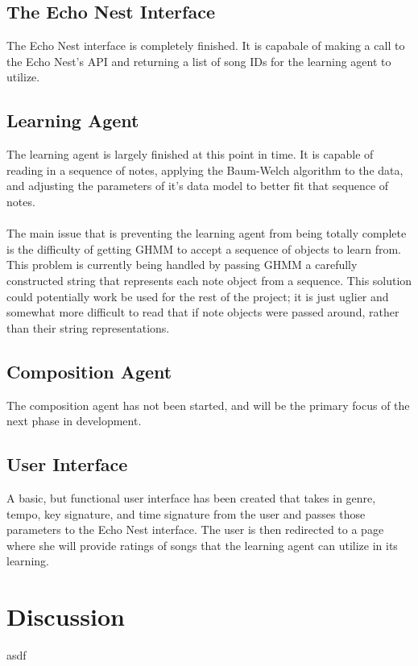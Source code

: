 \documentclass{article}
\begin{document}
\subsection{The Echo Nest Interface}
The Echo Nest interface is completely finished.  It is capabale of making a call to the Echo Nest's API and
returning a list of song IDs for the learning agent to utilize.

\subsection{Learning Agent}
The learning agent is largely finished at this point in time. It is capable of reading in a sequence
of notes, applying the Baum-Welch algorithm to the data, and adjusting the parameters of it's data
model to better fit that sequence of notes.\\
\\
The main issue that is preventing the learning agent from being totally complete is the difficulty
of getting GHMM to accept a sequence of objects to learn from. This problem is currently being
handled by passing GHMM a carefully constructed string that represents each note object from a 
sequence. This solution could potentially work be used for the rest of the project; it is just
uglier and somewhat more difficult to read that if note objects were passed around, rather than
their string representations.

\subsection{Composition Agent}
The composition agent has not been started, and will be the primary focus of the next phase in development.

\subsection{User Interface}
A basic, but functional user interface has been created that takes in genre, tempo, key signature, and time
signature from the user and passes those parameters to the Echo Nest interface. The user is then redirected
to a page where she will provide ratings of songs that the learning agent can utilize in its learning.

\section{Discussion}
asdf



\end{document}
